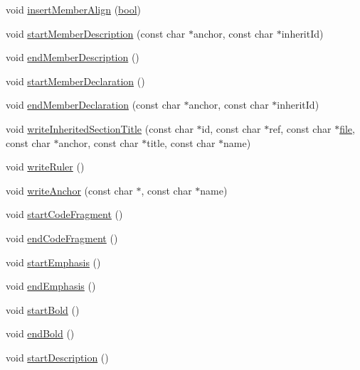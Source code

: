 \begin{DoxyCompactItemize}
\item 
void \hyperlink{class_html_generator_a9342c375b88fae1c32c8aa9620142ee1}{insert\+Member\+Align} (\hyperlink{qglobal_8h_a1062901a7428fdd9c7f180f5e01ea056}{bool})
\item 
void \hyperlink{class_html_generator_a15f4314a8389df51f3470e22cec6a72d}{start\+Member\+Description} (const char $\ast$anchor, const char $\ast$inherit\+Id)
\item 
void \hyperlink{class_html_generator_a8a2091bbac16931ce0f519f43658cf37}{end\+Member\+Description} ()
\item 
void \hyperlink{class_html_generator_a16eb9767a8460f94d578bc9c0e62b581}{start\+Member\+Declaration} ()
\item 
void \hyperlink{class_html_generator_a9b8cedda7c063179e583296294606469}{end\+Member\+Declaration} (const char $\ast$anchor, const char $\ast$inherit\+Id)
\item 
void \hyperlink{class_html_generator_a125754fb3b5f8986ed030a33e8d53de0}{write\+Inherited\+Section\+Title} (const char $\ast$id, const char $\ast$ref, const char $\ast$\hyperlink{class_output_generator_aed5ad11c3844cdf71ec6fee6c1c84286}{file}, const char $\ast$anchor, const char $\ast$title, const char $\ast$name)
\item 
void \hyperlink{class_html_generator_aa8f5d1eab68eb5fd43f2529c947f0a02}{write\+Ruler} ()
\item 
void \hyperlink{class_html_generator_a9bc82a247269f9294be37a72460f5ff8}{write\+Anchor} (const char $\ast$, const char $\ast$name)
\item 
void \hyperlink{class_html_generator_ac071e1f57eb6e4b2d4baeae1723186bd}{start\+Code\+Fragment} ()
\item 
void \hyperlink{class_html_generator_a6df6ede2137490c79228b9825df3b263}{end\+Code\+Fragment} ()
\item 
void \hyperlink{class_html_generator_afa50b0bc75a1f73eb0e86d4718534d1b}{start\+Emphasis} ()
\item 
void \hyperlink{class_html_generator_a88c2f4c34f00161d34e4c1059d747381}{end\+Emphasis} ()
\item 
void \hyperlink{class_html_generator_a4785d0f1ac1828284aa1f21dbb1e3773}{start\+Bold} ()
\item 
void \hyperlink{class_html_generator_a8e60c605c5db7577e2e0256c0431dcb1}{end\+Bold} ()
\item 
void \hyperlink{class_html_generator_a8ae03ee5e64d705aeebbe605d3c05b0f}{start\+Description} ()
\item 

\end{DoxyCompactItemize}
